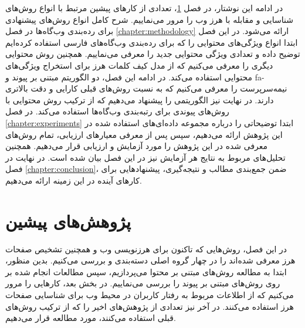 \documentclass[twoside, a4paper,11pt]{book}
\numberwithin{equation}{chapter}
\numberwithin{table}{chapter}
\numberwithin{figure}{chapter}
\numberwithin{equation}{chapter}
\newcommand{\mls}[1]{\gls{fa-#1}\glsuseri{la-#1}}
\begin{document}
در ادامه این نوشتار، در فصل \ref{chapter:relatedWork}، تعدادی از کارهای پیشین مرتبط با انواع روش‌های شناسایی و مقابله با هرز وب را مرور می‌نماییم. شرح کامل انواع روش‌های پیشنهادی برای رده‌بندی وب‌گاه‌ها در فصل \ref{chapter:methodology} ارائه می‌شود. در این فصل ابتدا انواع ویژگی‌های محتوایی را که برای رده‌بندی وب‌گاه‌های فارسی استفاده کرده‌ایم توضیح داده و تعدادی ویژگی محتوایی جدید را معرفی می‌نماییم. همچنین روش محتوایی دیگری را معرفی می‌کنیم که از مدل کیف کلمات هرز برای استخراج ویژگی‌های محتوایی استفاده می‌کند. در ادامه این فصل، دو الگوریتم مبتنی بر پیوند و \mls{نیمه‌سرپرست} را معرفی می‌کنیم که به نسبت روش‌های قبلی کارایی و دقت بالاتری دارند. در نهایت نیز الگوریتمی را پیشنهاد می‌دهیم که از ترکیب  روش محتوایی با روش‌های پیوندی برای رتبه‌بندی وب‌گاه‌ها استفاده می‌کند. در فصل \ref{chapter:experiments} ابتدا توضیحاتی را درباره مجموعه داده‌ای‌های استفاده شده در این پژوهش ارائه می‌دهیم، سپس پس از معرفی معیارهای ارزیابی، تمام روش‌های معرفی شده در این پژوهش را مورد آزمایش و ارزیابی قرار می‌دهیم. همچنین تحلیل‌های مربوط به نتایج هر آزمایش نیز در این فصل بیان شده است. در نهایت در فصل \ref{chapter:conclusion}، ضمن جمع‌بندی مطالب و نتیجه‌گیری، پیشنهادهایی برای کارهای آینده در این زمینه ارائه می‌دهیم.


\chapter{پژوهش‌های پیشین}
\label{chapter:relatedWork}
\thispagestyle{plain}
در این فصل، روش‌هایی که تاکنون برای هرزنویسی وب و همچنین تشخیص صفحات هرز معرفی شده‌اند را در چهار گروه اصلی دسته‌بندی و بررسی می‌کنیم. بدین منظور، ابتدا به مطالعه روش‌های مبتنی بر محتوا می‌پردازیم، سپس مطالعات انجام شده بر روی روش‌های مبتنی بر پیوند را بررسی می‌نماییم. در بخش بعد، کارهایی را مرور می‌کنیم که از اطلاعات مربوط به رفتار کاربران در محیط وب برای شناسایی صفحات هرز استفاده می‌کنند. در آخر نیز تعدادی از پژوهش‌های اخیر را که از ترکیب روش‌های قبلی استفاده می‌کنند، مورد مطالعه قرار می‌دهیم.
\end{document}

